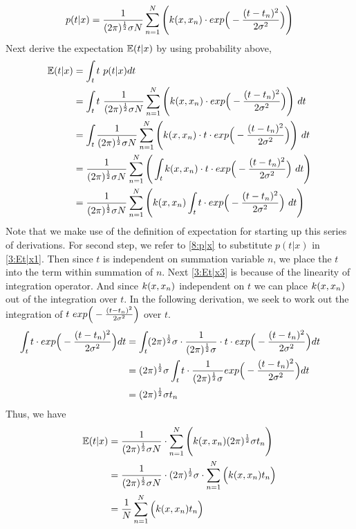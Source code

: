 \documentclass[11pt,a4paper]{article}
\newcommand{\htab}{\hspace*{0.63cm}}
\begin{document}
{\begin{align}
    p(t|x) = \frac{1}{(2\pi)^{\frac{1}{2}} \sigma N}  \sum_{n=1}^{N}  \Bigg( k(x,x_{n}) \cdot exp \Big( - \frac{(t-t_{n})^{2}}{2\sigma^{2}} \Big) \Bigg)
        \label{8:p|x}
    \end{align}
\htab Next derive the expectation $\mathbb{E} (t|x)$ by using probability above,
    \begin{align}
        \mathbb{E} (t|x) &= \int_{t} t\ p(t|x) d t 
                \label{3:Et|x0} \\
                 &= \int_{t} t\ \frac{1}{(2\pi)^{\frac{1}{2}} \sigma N}  \sum_{n=1}^{N}  \Bigg( k(x,x_{n}) \cdot exp \Big( - \frac{(t-t_{n})^{2}}{2\sigma^{2}} \Big) \Bigg)\ dt  
                \label{3:Et|x1} \\
                 &= \int_{t} \frac{1}{(2\pi)^{\frac{1}{2}} \sigma N}  \sum_{n=1}^{N}  \Bigg( k(x,x_{n}) \cdot t \cdot exp \Big( - \frac{(t-t_{n})^{2}}{2\sigma^{2}} \Big) \Bigg)\ dt 
                \label{3:Et|x2} \\
                 &=  \frac{1}{(2\pi)^{\frac{1}{2}} \sigma N}  \sum_{n=1}^{N}  \Bigg( \int_{t} k(x,x_{n}) \cdot t \cdot exp \Big( - \frac{(t-t_{n})^{2}}{2\sigma^{2}} \Big)\ dt \Bigg) 
                \label{3:Et|x3} \\
                 &=  \frac{1}{(2\pi)^{\frac{1}{2}} \sigma N}  \sum_{n=1}^{N}  \Bigg( k(x,x_{n}) \int_{t}  t \cdot exp \Big( - \frac{(t-t_{n})^{2}}{2\sigma^{2}} \Big)\ dt \Bigg) 
                \label{3:Et|x4}
    \end{align}
\htab Note that we make use of the definition of expectation for starting up this series of derivations.
For second step, we refer to \eqref{8:p|x} to substitute $p(t|x)$ in \eqref{3:Et|x1}. Then since $t$ is
independent on summation variable $n$, we place the $t$ into the term within summation of $n$. Next 
\eqref{3:Et|x3} is because of the linearity of integration operator. And since $k(x,x_{n})$ independent on $t$ 
we can place $k(x,x_{n})$ out of the integration over $t$. In the following derivation, we seek to work out
the integration of $t\ exp \Big( - \frac{(t-t_{n})^{2}}{2\sigma^{2}} \Big)$ over $t$. 
    \begin{align}
        \int_{t} t \cdot exp \Big( - \frac{(t-t_{n})^{2}}{2\sigma^{2}} \Big) dt 
        &= \int_{t} (2\pi)^{\frac{1}{2}} \sigma \cdot \frac{1}{ (2\pi)^{\frac{1}{2}} \sigma} \cdot t \cdot exp \Big( - \frac{(t-t_{n})^{2}}{2\sigma^{2}} \Big) dt \\
        &= (2\pi)^{\frac{1}{2}} \sigma \int_{t} t \cdot \frac{1}{ (2\pi)^{\frac{1}{2}} \sigma} exp \Big( - \frac{(t-t_{n})^{2}}{2\sigma^{2}} \Big) dt \\
        &= (2\pi)^{\frac{1}{2}} \sigma t_{n} 
        &&\mbox {} \label{8:expectation}
    \end{align}
\htab Thus, we have
\begin{align}
     \mathbb{E} (t|x)  &=  \frac{1}{(2\pi)^{\frac{1}{2}} \sigma N} \cdot \sum_{n=1}^{N}  \Bigg( k(x,x_{n}) (2\pi)^{\frac{1}{2}} \sigma t_{n} \Bigg)  \\ 
               &=  \frac{1}{(2\pi)^{\frac{1}{2}} \sigma N} \cdot (2\pi)^{\frac{1}{2}} \sigma \cdot \sum_{n=1}^{N}  \Big( k(x,x_{n})  t_{n} \Big)  \\
               &=  \frac{1}{N} \sum_{n=1}^{N}  \Big( k(x,x_{n}) t_{n} \Big)
    \label{3:t|xExpect} 
    \end{align}
}
\end{document}
